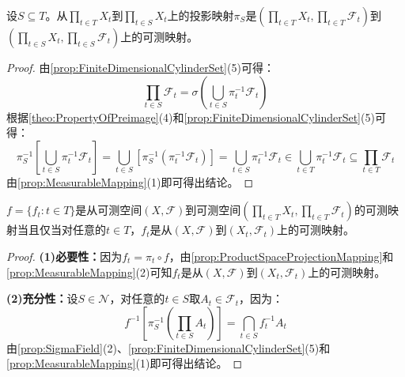 \begin{property}\label{prop:ProductSpaceProjectionMapping}
	设$S\subseteq T$。从$\prod\limits_{t\in T}X_t$到$\prod\limits_{t\in S}X_t$上的投影映射$\pi_S$是$\left(\prod\limits_{t\in T}X_t,\prod\limits_{t\in T}\mathscr{F}_t\right)$到$\left(\prod\limits_{t\in S}X_t,\prod\limits_{t\in S}\mathscr{F}_t\right)$上的可测映射。
\end{property}
\begin{proof}
	由\cref{prop:FiniteDimensionalCylinderSet}(5)可得：
	\begin{equation*}
		\prod_{t\in S}\mathscr{F}_t=\sigma\left(\underset{t\in S}{\bigcup}\pi_t^{-1}\mathscr{F}_t\right)
	\end{equation*}
	根据\cref{theo:PropertyOfPreimage}(4)和\cref{prop:FiniteDimensionalCylinderSet}(5)可得：
	\begin{equation*}
		\pi_S^{-1}\left[\underset{t\in S}{\bigcup}\pi_t^{-1}\mathscr{F}_t\right]=\underset{t\in S}{\bigcup}[\pi_S^{-1}(\pi_t^{-1}\mathscr{F}_t)]=\underset{t\in S}{\bigcup}\pi_t^{-1}\mathscr{F}_t\in\underset{t\in T}{\bigcup}\pi_t^{-1}\mathscr{F}_t\subseteq\prod_{t\in T}\mathscr{F}_t
	\end{equation*}
	由\cref{prop:MeasurableMapping}(1)即可得出结论。
\end{proof}
\begin{theorem}\label{theo:ProductMeasurable}
	$f=\{f_t:t\in T\}$是从可测空间$(X,\mathscr{F})$到可测空间$\left(\prod\limits_{t\in T}X_t,\prod\limits_{t\in T}\mathscr{F}_t\right)$的可测映射当且仅当对任意的$t\in T$，$f_t$是从$(X,\mathscr{F})$到$(X_t,\mathscr{F}_t)$上的可测映射。
\end{theorem}
\begin{proof}
	\textbf{(1)必要性：}因为$f_t=\pi_t\circ f$，由\cref{prop:ProductSpaceProjectionMapping}和\cref{prop:MeasurableMapping}(2)可知$f_t$是从$(X,\mathscr{F})$到$(X_t,\mathscr{F}_t)$上的可测映射。\par
	\textbf{(2)充分性：}设$S\in\mathcal{N}$，对任意的$t\in S$取$A_t\in\mathscr{F}_t$，因为：
	\begin{equation*}
		f^{-1}\left[\pi_S^{-1}\left(\prod_{t\in S}A_t\right)\right]=\underset{t\in S}{\bigcap}f_t^{-1}A_t
	\end{equation*}
	由\cref{prop:SigmaField}(2)、\cref{prop:FiniteDimensionalCylinderSet}(5)和\cref{prop:MeasurableMapping}(1)即可得出结论。
\end{proof}

